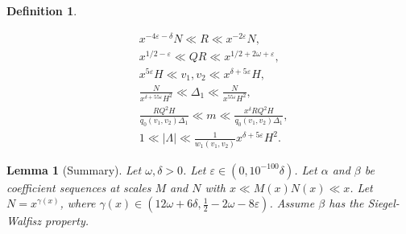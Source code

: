 \documentclass{amsart}
\newtheorem{lemma}{Lemma}
\newtheorem{defn}{Definition}
\numberwithin{equation}{section}
\begin{document}
\begin{defn}
\begin{enumerate}[{\rm (i)}]
\begin{align*}
&x^{-4\varepsilon-\delta}N \ll R \ll x^{-2\varepsilon}N, \\
&x^{1/2-\varepsilon} \ll QR \ll x^{1/2+2\omega+\varepsilon}, \\ 
&x^{5\varepsilon}H \ll v_1, v_2 \ll x^{\delta+5\varepsilon}H,\\
 &\tfrac{N}{x^{\delta+55\varepsilon}H^2}\ll \Delta_1 \ll \tfrac{N}{x^{55\varepsilon}H^2}, \\
 &\tfrac{RQ^2H}{q_0 (v_1,v_2)\Delta_1} \ll m \ll \tfrac{x^{\delta}RQ^2H}{q_0 (v_1,v_2)\Delta_1}, \\
&1 \ll |\Lambda| \ll \tfrac{1}{w_1(v_1,v_2)}x^{\delta+5\varepsilon}H^2.
\end{align*}
\end{enumerate}
\end{defn}

\begin{lemma}[Summary]\label{lem:summary}
Let $\omega, \delta >0$. Let $\varepsilon \in (0, 10^{-100}\delta)$. 
 Let $\alpha$ and $\beta$ be coefficient sequences at scales $M$ and $N$ with $x \ll M(x)N(x) \ll x$.  Let $N= x^{\gamma(x)}$, where $\gamma(x)  \in (12\omega+6\delta,\frac{1}{2}-2\omega-8\varepsilon)$. Assume $\beta$ has the Siegel-Walfisz property.
 

\end{lemma}
\end{document}
